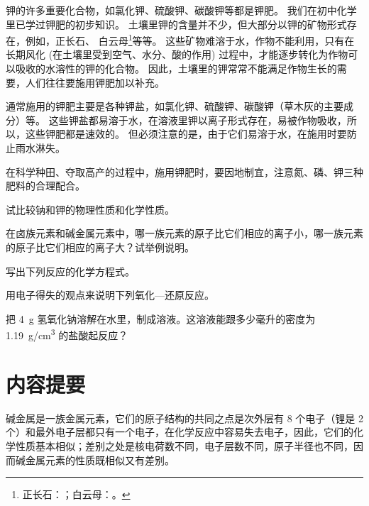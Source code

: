 钾的许多重要化合物，如氯化钾、硫酸钾、碳酸钾等都是钾肥。
我们在初中化学里已学过钾肥的初步知识。
土壤里钾的含量并不少，但大部分以钾的矿物形式存在，例如，正长石、 白云母\footnote{正长石：；白云母：。}等等。
这些矿物难溶于水，作物不能利用，只有在长期风化 (在土壤里受到空气、水分、酸的作用) 过程中，才能逐步转化为作物可以吸收的水溶性的钾的化合物。
因此，土壤里的钾常常不能满足作物生长的需要，人们往往要施用钾肥加以补充。

通常施用的钾肥主要是各种钾盐，如氯化钾、硫酸钾、碳酸钾（草木灰的主要成分）等。
这些钾盐都易溶于水，在溶液里钾以离子形式存在，易被作物吸收，所以，这些钾肥都是速效的。
但必须注意的是，由于它们易溶于水，在施用时要防止雨水淋失。

在科学种田、夺取高产的过程中，施用钾肥时，要因地制宜，注意氮、磷、钾三种肥料的合理配合。

\begin{Practice}[习题]
  \begin{question}
    \item 试比较钠和钾的物理性质和化学性质。
    \item 在卤族元素和碱金属元素中，哪一族元素的原子比它们相应的离子小，哪一族元素的原子比它们相应的离子大？试举例说明。
    \item 写出下列反应的化学方程式。
    \begin{tasks}
      \task {}
      \task {}
      \task {}
    \end{tasks}
    \item 用电子得失的观点来说明下列氧化—还原反应。
    \begin{tasks}
      \task {}
      \task {}
    \end{tasks}
    \item 把 \qty{4}{g} 氢氧化钠溶解在水里，制成溶液。这溶液能跟多少毫升的密度为 \qty{1.19}{g/cm^3} 的盐酸起反应？
  \end{question}
\end{Practice}
\section*{内容提要}
碱金属是一族金属元素，它们的原子结构的共同之点是次外层有 8 个电子（锂是 2 个）和最外电子层都只有一个电子，在化学反应中容易失去电子，因此，它们的化学性质基本相似；差别之处是核电荷数不同，电子层数不同，原子半径也不同，因而碱金属元素的性质既相似又有差别。

